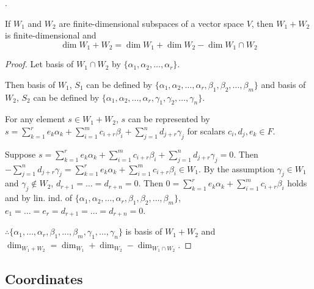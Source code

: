 \documentclass[8pt]{beamer}
\begin{document}
\begin{frame}{.}
    \begin{theorem}
        If $W_1$ and $W_2$ are finite-dimensional subspaces of a vector space $V$, then $W_1 + W_2$ is finite-dimensional and
        \[
            \dim{W_1 + W_2} = \dim{W_1} + \dim{W_2} - \dim{W_1 \cap W_2}
        \]
    \end{theorem}

    \begin{proof}
        Let basis of $W_1 \cap W_2$ by $\{\alpha_1, \alpha_2, \dots, \alpha_r\}$.

        Then basis of $W_1$, $S_1$ can be defined by $\{\alpha_1, \alpha_2, \dots, \alpha_r, \beta_1, \beta_2, \dots, \beta_m\}$ and basis of $W_2$, $S_2$ can be defined by $\{\alpha_1, \alpha_2, \dots, \alpha_r, \gamma_1, \gamma_2, \dots, \gamma_n\}$.
        
        For any element $s \in W_1 + W_2$, $s$ can be represented by $s = \sum_{k=1}^r e_k \alpha_k + \sum_{i=1}^{m} c_{i+r} \beta_{i}+ \sum_{j=1}^n d_{j+r} \gamma_j$ for scalars $c_i, d_j, e_k\in F$.

        Suppose $s = \sum_{k=1}^r e_k \alpha_k + \sum_{i=1}^{m} c_{i+r} \beta_{i}+ \sum_{j=1}^n d_{j+r} \gamma_j = 0$. Then $-\sum_{j=1}^n d_{j+r}\gamma_j = \sum_{k=1}^r e_k \alpha_k + \sum_{i=1}^{m} c_{i+r} \beta_{i} \in W_1$.  By the assumption $\gamma_j \in W_1$ and $\gamma_j \notin W_2$, $d_{r+1} =  \dots =  d_{r+n} = 0$. Then $0 = \sum_{k=1}^r e_k \alpha_k + \sum_{i=1}^m c_{i+r} \beta_i$ holds and by lin. ind. of $\{\alpha_1, \alpha_2, \dots, \alpha_r, \beta_1, \beta_2, \dots, \beta_m\}$, $e_1 = \dots = e_r = d_{r+1} = \dots = d_{r+n} = 0$.

        $\therefore  \{\alpha_1, \dots, \alpha_r, \beta_1, \dots, \beta_m , \gamma_1, \dots, \gamma_n\}$ is basis of $W_1 + W_2$ and  $\dim_{W_1+W_2} = \dim_{W_1} + \dim_{W_2} - \dim_{W_1 \cap W_2}$.
    \end{proof}
\end{frame}

\subsection{Coordinates}
\end{document}
